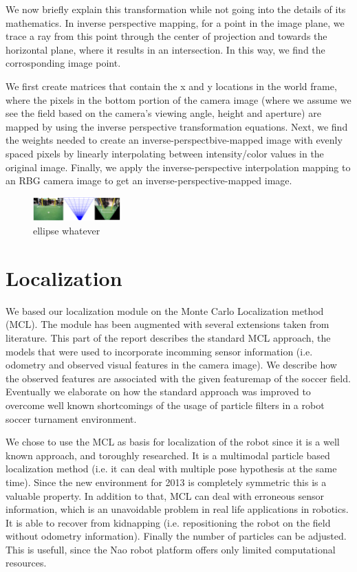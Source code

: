 \documentclass[	DIV=calc,%
							paper=a4,%
							fontsize=9pt,%
							twocolumn]{scrartcl}	 					%
\begin{document}
We now briefly explain this transformation\cite{IPM} while not going into the details of its mathematics. In inverse perspective mapping, for a point in the image plane, we trace a ray from this point through the center of projection and towards the horizontal plane, where it results in an intersection. In this way, we find the corrosponding image point.

We first create matrices that contain the x and y locations in the world frame, where the pixels in the bottom portion of the camera image (where we assume we see the field based on the camera's viewing angle, height and aperture) are mapped by using the inverse perspective transformation equations. Next, we find the weights needed to create an inverse-perspectbive-mapped image with evenly spaced pixels by linearly interpolating between intensity/color values in the original image. Finally, we apply the inverse-perspective interpolation mapping to an RBG camera image to get an inverse-perspective-mapped image\cite{IPMCode}.


\begin{figure}[t!]
\caption{ellipse whatever}
\label{ellipse2}
\centering    
\includegraphics[width=0.3\textwidth]{figures/imagePixelsMapped.png}
\end{figure}


\section{Localization}
\label{sec:Localization}
We based our localization module on the Monte Carlo Localization method (MCL). The module has been augmented with several extensions taken from literature. This part of the report describes the standard MCL approach, the models that were used to incorporate incomming sensor information (i.e. odometry and observed visual features in the camera image). We describe how the observed features are associated with the given featuremap of the soccer field. Eventually we elaborate on how the standard approach was improved to overcome well known shortcomings of the usage of particle filters in a robot soccer turnament environment.

We chose to use the MCL as basis for localization of the robot since it is a well known approach, and toroughly researched. It is a multimodal particle based localization method (i.e. it can deal with multiple pose hypothesis at the same time). Since the new environment for 2013 is completely symmetric this is a valuable property. In addition to that, MCL can deal with erroneous sensor information, which is an unavoidable problem in real life applications in robotics. It is able to recover from kidnapping (i.e. repositioning the robot on the field without odometry information). Finally the number of particles can be adjusted. This is usefull, since the Nao robot platform offers only limited computational resources.
\end{document}
